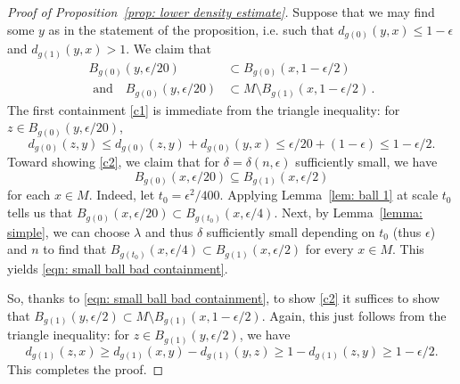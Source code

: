 \documentclass[11pt,reqno]{amsart}
\theoremstyle{remark}
\theoremstyle{definition}
\numberwithin{equation}{section}
\newcommand{\e}{{\epsilon}}
\begin{document}
\begin{proof}[Proof of Proposition~\ref{prop: lower density estimate}] 
Suppose that we may find some $y$ as in the statement of the proposition, i.e. such that $d_{g(0)}(y, x) \leq 1-\e$ and $d_{g(1)}(y, x)>1$. We claim that 
	\begin{align}
\label{c1}		B_{g(0)}(y ,\e / 20) &\subset B_{g(0)}(x, 1-\e / 2) \\
\label{c2}	  \text{ and}	\quad B_{g(0)}(y ,\e / 20) &\subset M\setminus B_{g(1)}(x, 1-\e / 2)\,.
	\end{align}
The first containment \eqref{c1} is immediate from the triangle inequality:  for $z \in B_{g(0)}(y, \e / 20)$, 
\[
d_{g(0)}(z, y) \leq d_{g(0)}(z, y)+d_{g(0)}(y, x)  \leq \e /20+(1-\e) \leq 1-\e / 2 .
\]
Toward showing \eqref{c2}, we claim that for $\delta = \delta(n,\e)$ sufficiently small, we have  
\begin{equation}
	\label{eqn: small ball bad containment}
	B_{g(0)}(x, \e/20) \subseteq B_{g(1)}(x,\e/2) 
\end{equation}
for each $x \in M.$  Indeed,  let $t_0 = \e^2/400$. 
	Applying  Lemma~\ref{lem: ball 1} at scale $t_0$ tells us that $B_{g(0)}(x, \e/20) \subset B_{g(t_0)} (x, \e/4).$ 
	Next, by  Lemma~\ref{lemma: simple}, we can choose $\lambda$ and thus $\delta$ sufficiently small depending on $t_0$ (thus $\e$) and $n$ to find that $B_{g(t_0)} (x, \e/4) \subset B_{g(1)}(x, \e/2)$ for every $x \in M$. This yields \eqref{eqn: small ball bad containment}.
	
So, thanks to \eqref{eqn: small ball bad containment},  to show \eqref{c2} it suffices to show that 
$ B_{g(1)}(y, \e / 2) \subset M \setminus B_{g(1)}(x, 1-\e / 2).$ Again, this just follows from the triangle inequality: for $z \in B_{g(1)}({y}, \e / 2)$, we have
\[
d_{g(1)}(z, x) \geq d_{g(1)}(x, y)-d_{g(1)}(y, z) \geq 1-d_{g(1)}(z,y) \geq 1-\e/2.
\]
This completes the proof.
\end{proof}

%
%
%
\end{document}
